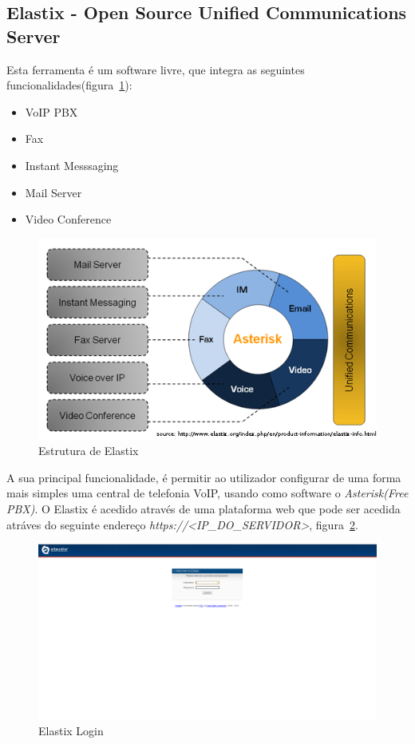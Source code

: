 \subsection{Elastix - Open Source Unified Communications Server}

Esta ferramenta é um software livre, que integra as seguintes funcionalidades(figura~\ref{fig:elastix}):
\begin{itemize}
\item VoIP PBX
\item Fax
\item Instant Messsaging
\item Mail Server
\item Video Conference
\end{itemize}

\begin{figure}[H]
    \begin{center}
        \includegraphics[width=12cm]{include/img/elastix.png}
    \end{center}
    \caption{Estrutura de Elastix}
    \label{fig:elastix}
\end{figure}

A sua principal funcionalidade, é permitir ao utilizador configurar de uma forma mais simples uma 
central de telefonia VoIP, usando como software o \emph{Asterisk(Free PBX)}. O Elastix é acedido através de uma plataforma
web que pode ser acedida atráves do seguinte endereço \emph{https://<IP\_DO\_SERVIDOR>}, figura~\ref{fig:elastix_login}.

\begin{figure}[H]
    \begin{center}
        \includegraphics[width=13cm]{include/img/elastix_login.png}
    \end{center}
    \caption{Elastix Login}
    \label{fig:elastix_login}
\end{figure}

